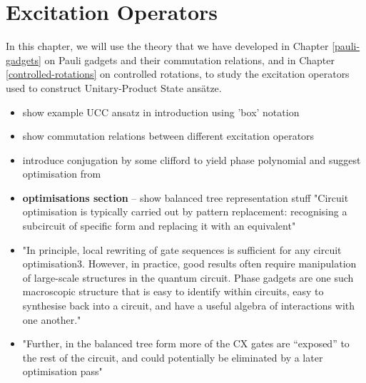 \chapter{Excitation Operators}%
\label{excitation-operators}

In this chapter, we will use the theory that we have developed in Chapter \ref{pauli-gadgets} on Pauli gadgets and their commutation relations, and in Chapter \ref{controlled-rotations} on controlled rotations, to study the excitation operators used to construct Unitary-Product State ansätze.


\begin{itemize}[itemsep=-5pt]
    \item show example UCC ansatz in introduction using 'box' notation
    \item show commutation relations between different excitation operators
    \item introduce conjugation by some clifford to yield phase polynomial and suggest optimisation from \cite{Cowtan2020}
    \item \textbf{optimisations section} -- show balanced tree representation stuff "Circuit optimisation is typically carried out by pattern replacement: recognising a subcircuit of specific form and replacing it with an equivalent" \cite{Cowtan2019}
    \item "In principle, local rewriting of gate sequences is sufficient for any circuit optimisation3. However, in practice, good results often require manipulation of large-scale structures in the quantum circuit. Phase gadgets are one such macroscopic structure that is easy to identify within circuits, easy to synthesise back into a circuit, and have a useful algebra of interactions with one another." \cite{Cowtan2019}
    \item "Further, in the balanced tree form more of the CX gates are “exposed” to the rest of the circuit, and could potentially be eliminated by a later optimisation pass" \cite{Cowtan2019}
\end{itemize}
